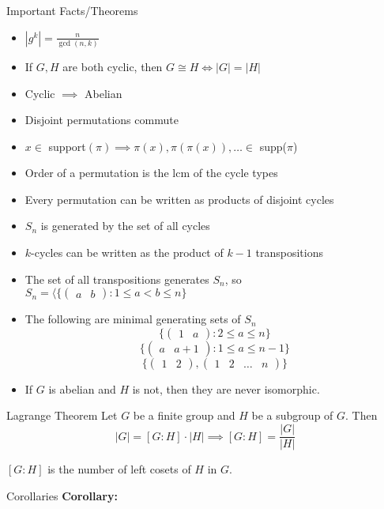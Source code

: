 \documentclass{article}
\begin{document}
\begin{multicols*}{3}
\begin{blackbox}{Important Facts/Theorems}
\begin{itemize}
        \item $|g^k| = \frac{n}{\gcd(n,k)}$
        \item If $G,H$ are both cyclic, then $G \cong H \iff |G| = |H|$
        \item Cyclic $\implies$ Abelian
        \item Disjoint permutations commute
        \item $x \in $ support$(\pi) \implies \pi(x), \pi(\pi(x)), \ldots \in$ supp($\pi$)
        \item Order of a permutation is the lcm of the cycle types
        \item Every permutation can be written as products of disjoint cycles
        \item $S_n$ is generated by the set of all cycles
        \item $k$-cycles can be written as the product of $k - 1$ transpositions
        \item The set of all transpositions generates $S_n$, so $S_n = \langle \{\begin{pmatrix}
            a & b
        \end{pmatrix}: 1 \leq a < b \leq n\}$
        \item The following are minimal generating sets of $S_n$
        \[\{\begin{pmatrix}
            1 & a
        \end{pmatrix}: 2 \leq a \leq n\}\]
        \[\{\begin{pmatrix}
            a & a+1
        \end{pmatrix}: 1 \leq a \leq n-1\}\]
        \[\{\begin{pmatrix}
            1 & 2
        \end{pmatrix}, \begin{pmatrix}
            1 & 2 & \ldots & n
        \end{pmatrix}\}\]
        \item If $G$ is abelian and $H$ is not, then they are never isomorphic.
    \end{itemize}
\end{blackbox}
\begin{blackbox}{Lagrange Theorem}
    Let $G$ be a finite group and $H$ be a subgroup of $G$. Then\\[-2ex]
    \[|G| = [G : H] \cdot |H| \implies [G:H] = \frac{|G|}{|H|}\]
    \raggedright
    $[G:H]$ is the number of left cosets of $H$ in $G$.
    \begin{bluebox}{Corollaries}
        \textbf{Corollary:}\\[-2ex]

\end{bluebox}
\end{blackbox}
\end{multicols*}
\end{document}
